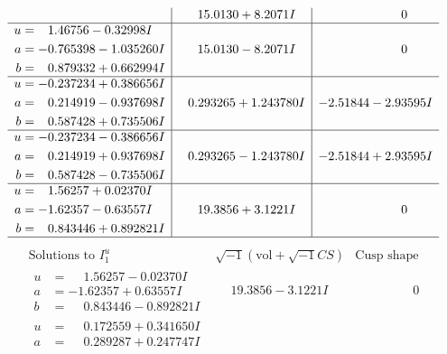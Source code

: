 \documentclass[1p]{elsarticle_modified}
\theoremstyle{definition}
\newcommand{\I}{\sqrt{-1}}
\begin{document}
$$\begin{array}{c|c|c}
 & \phantom{-}15.0130 + 8.2071 I & \phantom{-0.000000 } 0 \\ \hline\begin{aligned}
u &= \phantom{-}1.46756 - 0.32998 I \\
a &= -0.765398 - 1.035260 I \\
b &= \phantom{-}0.879332 + 0.662994 I\end{aligned}
 & \phantom{-}15.0130 - 8.2071 I & \phantom{-0.000000 } 0 \\ \hline\begin{aligned}
u &= -0.237234 + 0.386656 I \\
a &= \phantom{-}0.214919 - 0.937698 I \\
b &= \phantom{-}0.587428 + 0.735506 I\end{aligned}
 & \phantom{-}0.293265 + 1.243780 I & -2.51844 - 2.93595 I \\ \hline\begin{aligned}
u &= -0.237234 - 0.386656 I \\
a &= \phantom{-}0.214919 + 0.937698 I \\
b &= \phantom{-}0.587428 - 0.735506 I\end{aligned}
 & \phantom{-}0.293265 - 1.243780 I & -2.51844 + 2.93595 I \\ \hline\begin{aligned}
u &= \phantom{-}1.56257 + 0.02370 I \\
a &= -1.62357 - 0.63557 I \\
b &= \phantom{-}0.843446 + 0.892821 I\end{aligned}
 & \phantom{-}19.3856 + 3.1221 I & \phantom{-0.000000 } 0\\
 \hline 
 \end{array}$$\newpage$$\begin{array}{c|c|c}  
\text{Solutions to }I^u_{1}& \I (\text{vol} + \sqrt{-1}CS) & \text{Cusp shape}\\
 \hline 
\begin{aligned}
u &= \phantom{-}1.56257 - 0.02370 I \\
a &= -1.62357 + 0.63557 I \\
b &= \phantom{-}0.843446 - 0.892821 I\end{aligned}
 & \phantom{-}19.3856 - 3.1221 I & \phantom{-0.000000 } 0 \\ \hline\begin{aligned}
u &= \phantom{-}0.172559 + 0.341650 I \\
a &= \phantom{-}0.289287 + 0.247747 I \\

\end{aligned}
\end{array}$$
\end{document}
